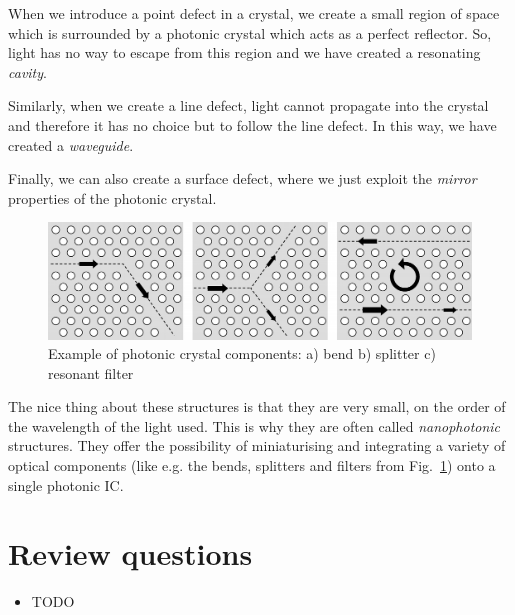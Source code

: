 When we introduce a point defect in a crystal, we create a small region of space which is surrounded by a photonic crystal which acts as a perfect reflector. So, light has no way to escape from this region and we have created a resonating \emph{cavity}.

Similarly, when we create a line defect, light cannot propagate into the crystal and therefore it has no choice but to follow the line defect. In this way, we have created a \emph{waveguide}.

Finally, we can also create a surface defect, where we just exploit the \emph{mirror} properties of the photonic crystal.

\begin{figure}
\centering
\includegraphics{symmetry/figures/2d_components}
\caption{Example of photonic crystal components: a) bend b) splitter c) resonant filter}
\label{fig-components}
\end{figure}

The nice thing about these structures is that they are very small, on the order of the wavelength of the light used. This is why they are often called \emph{nanophotonic} structures. They offer the possibility of miniaturising and integrating a variety of optical components (like e.g. the bends, splitters and filters from Fig.~\ref{fig-components}) onto a single photonic IC.


\section*{Review questions}

\begin{itemize}
\item TODO  
\end{itemize}

\pagebreak




